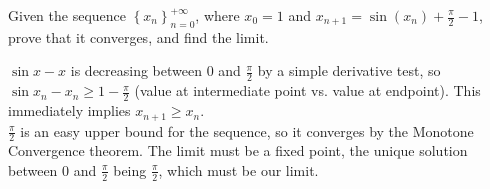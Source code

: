 \begin{problem}
    Given the sequence \( \left\{x_n\right\}_{n=0}^{+\infty} \), where \( x_0 = 1 \) and \( x_{n+1} = \sin\left(x_n\right)+\frac{\pi}{2}-1 \), prove that it converges, and find the limit.
\end{problem}
\begin{solution}
    \( \sin x - x \) is decreasing between \( 0 \) and \( \frac{\pi}{2} \) by a simple derivative test, so \( \sin x_n - x_n \geq 1 - \frac{\pi}{2} \) (value at intermediate point vs. value at endpoint). This immediately implies \( x_{n+1} \geq x_n \).\\
    \( \frac{\pi}{2} \) is an easy upper bound for the sequence, so it converges by the Monotone Convergence theorem. The limit must be a fixed point, the unique solution between \( 0 \) and \( \frac{\pi}{2} \) being \( \frac{\pi}{2} \), which must be our limit.
\end{solution}
